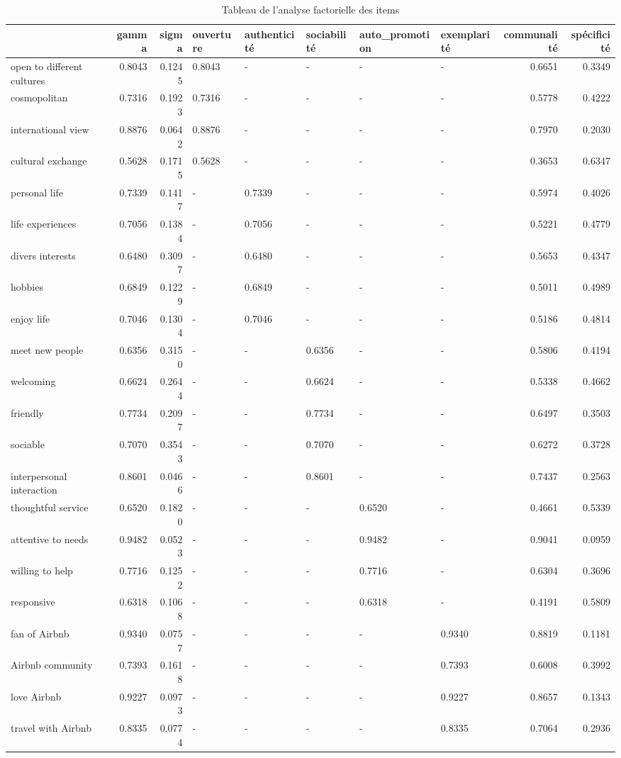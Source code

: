 \begin{table}
\caption{Tableau de l'analyse factorielle des items}
\label{tab:items_fa}
\begin{tabular}{lrrlllllrr}
\toprule
 & gamma & sigma & ouverture & authenticité & sociabilité & auto\_promotion & exemplarité & communalité & spécificité \\
\midrule
open to different cultures & 0.8043 & 0.1245 & 0.8043 & - & - & - & - & 0.6651 & 0.3349 \\
cosmopolitan & 0.7316 & 0.1923 & 0.7316 & - & - & - & - & 0.5778 & 0.4222 \\
international view & 0.8876 & 0.0642 & 0.8876 & - & - & - & - & 0.7970 & 0.2030 \\
cultural exchange & 0.5628 & 0.1715 & 0.5628 & - & - & - & - & 0.3653 & 0.6347 \\
personal life & 0.7339 & 0.1417 & - & 0.7339 & - & - & - & 0.5974 & 0.4026 \\
life experiences & 0.7056 & 0.1384 & - & 0.7056 & - & - & - & 0.5221 & 0.4779 \\
divers interests & 0.6480 & 0.3097 & - & 0.6480 & - & - & - & 0.5653 & 0.4347 \\
hobbies & 0.6849 & 0.1229 & - & 0.6849 & - & - & - & 0.5011 & 0.4989 \\
enjoy life & 0.7046 & 0.1304 & - & 0.7046 & - & - & - & 0.5186 & 0.4814 \\
meet new people & 0.6356 & 0.3150 & - & - & 0.6356 & - & - & 0.5806 & 0.4194 \\
welcoming & 0.6624 & 0.2644 & - & - & 0.6624 & - & - & 0.5338 & 0.4662 \\
friendly & 0.7734 & 0.2097 & - & - & 0.7734 & - & - & 0.6497 & 0.3503 \\
sociable & 0.7070 & 0.3543 & - & - & 0.7070 & - & - & 0.6272 & 0.3728 \\
interpersonal interaction & 0.8601 & 0.0466 & - & - & 0.8601 & - & - & 0.7437 & 0.2563 \\
thoughtful service & 0.6520 & 0.1820 & - & - & - & 0.6520 & - & 0.4661 & 0.5339 \\
attentive to needs & 0.9482 & 0.0523 & - & - & - & 0.9482 & - & 0.9041 & 0.0959 \\
willing to help & 0.7716 & 0.1252 & - & - & - & 0.7716 & - & 0.6304 & 0.3696 \\
responsive & 0.6318 & 0.1068 & - & - & - & 0.6318 & - & 0.4191 & 0.5809 \\
fan of Airbnb & 0.9340 & 0.0757 & - & - & - & - & 0.9340 & 0.8819 & 0.1181 \\
Airbnb community & 0.7393 & 0.1618 & - & - & - & - & 0.7393 & 0.6008 & 0.3992 \\
love Airbnb & 0.9227 & 0.0973 & - & - & - & - & 0.9227 & 0.8657 & 0.1343 \\
travel with Airbnb & 0.8335 & 0.0774 & - & - & - & - & 0.8335 & 0.7064 & 0.2936 \\
\bottomrule
\end{tabular}
\end{table}
